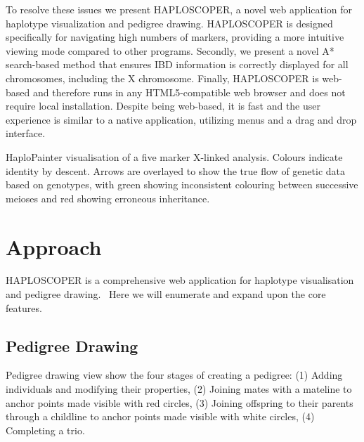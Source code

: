 \documentclass{assets/biotemplate/bioinfo}
\numberwithin{equation}{section}
\def\haplo{{HAPLOSCOPER}}            %
\def\hpainter{{HaploPainter}}
\begin{document}
To resolve these issues we present \haplo{}, a novel web application for haplotype visualization and pedigree drawing. \haplo{} is designed specifically for navigating high numbers of markers, providing a more intuitive viewing mode compared to other programs. 
Secondly, we present a novel A* search-based method that ensures IBD information is correctly displayed for all chromosomes, including the X chromosome.
%
%
%
Finally, \haplo{} is web-based and therefore runs in any HTML5-compatible web browser and does not require local installation. Despite being web-based, it is fast and the user experience is similar to a native application, utilizing menus and a drag and drop interface.

	{\hpainter{} visualisation of a five marker X-linked analysis. Colours indicate identity by descent. Arrows are overlayed to show the true flow of genetic data based on genotypes, with green showing inconsistent colouring between successive meioses and red showing erroneous inheritance.}




\section{Approach}

\haplo{} is a comprehensive web application for haplotype visualisation and pedigree drawing.\
Here we will enumerate and expand upon the core features.

\subsection{Pedigree Drawing}

	{Pedigree drawing view show the four stages of creating a pedigree: (1) Adding individuals and modifying their properties, (2) Joining mates with a mateline to anchor points made visible with red circles, (3) Joining offspring to their parents through a childline to anchor points made visible with white circles, (4) Completing a trio.}
	
\end{document}
